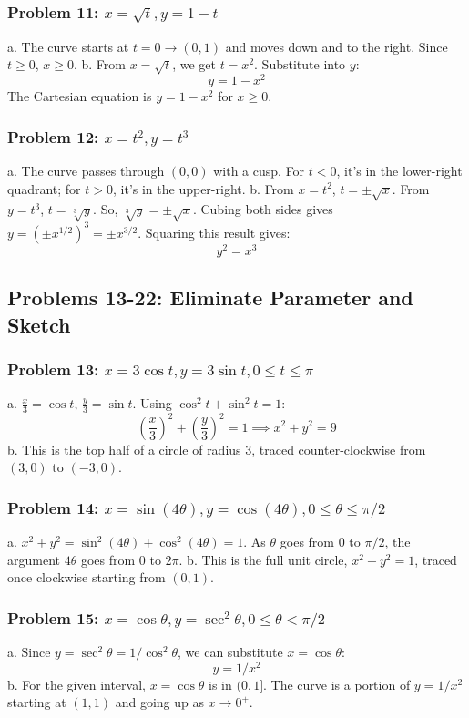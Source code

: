 \documentclass{article}
\begin{document}
\subsubsection{Problem 11: \(x = \sqrt{t}, y = 1 - t\)}
a. The curve starts at \(t=0 \to (0, 1)\) and moves down and to the right. Since \(t \ge 0\), \(x \ge 0\).
b. From \(x = \sqrt{t}\), we get \(t = x^2\). Substitute into \(y\):
\[y = 1 - x^2\]
The Cartesian equation is \(y = 1 - x^2\) for \(x \ge 0\).

\subsubsection{Problem 12: \(x = t^2, y = t^3\)}
a. The curve passes through \((0,0)\) with a cusp. For \(t<0\), it's in the lower-right quadrant; for \(t>0\), it's in the upper-right.
b. From \(x=t^2\), \(t = \pm\sqrt{x}\). From \(y=t^3\), \(t = \sqrt[3]{y}\). So, \(\sqrt[3]{y} = \pm\sqrt{x}\). Cubing both sides gives \(y = (\pm x^{1/2})^3 = \pm x^{3/2}\). Squaring this result gives:
\[y^2 = x^3\]

\subsection{Problems 13-22: Eliminate Parameter and Sketch}

\subsubsection{Problem 13: \(x=3\cos t, y=3\sin t, 0 \le t \le \pi\)}
a. \(\frac{x}{3} = \cos t\), \(\frac{y}{3} = \sin t\). Using \(\cos^2 t + \sin^2 t = 1\):
\[\left(\frac{x}{3}\right)^2 + \left(\frac{y}{3}\right)^2 = 1 \implies x^2+y^2=9\]
b. This is the top half of a circle of radius 3, traced counter-clockwise from \((3,0)\) to \((-3,0)\).

\subsubsection{Problem 14: \(x=\sin(4\theta), y=\cos(4\theta), 0 \le \theta \le \pi/2\)}
a. \(x^2+y^2 = \sin^2(4\theta) + \cos^2(4\theta) = 1\). As \(\theta\) goes from 0 to \(\pi/2\), the argument \(4\theta\) goes from 0 to \(2\pi\).
b. This is the full unit circle, \(x^2+y^2=1\), traced once clockwise starting from \((0,1)\).

\subsubsection{Problem 15: \(x=\cos\theta, y=\sec^2\theta, 0 \le \theta < \pi/2\)}
a. Since \(y = \sec^2\theta = 1/\cos^2\theta\), we can substitute \(x=\cos\theta\):
\[y = 1/x^2\]
b. For the given interval, \(x=\cos\theta\) is in \((0, 1]\). The curve is a portion of \(y=1/x^2\) starting at \((1,1)\) and going up as \(x \to 0^+\).
\end{document}
